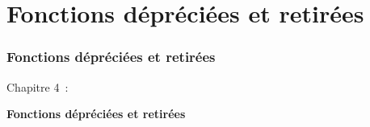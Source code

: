 %

\section{Fonctions dépréciées et retirées}
\begin{frame}[fragile]
	\frametitle{Fonctions dépréciées et retirées}

	\begin{center}\huge{Chapitre 4~:}\end{center}
	\begin{center}\huge{\color{typo3darkgrey}\textbf{Fonctions dépréciées et retirées}}\end{center}

\end{frame}


